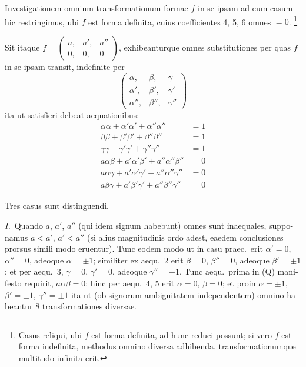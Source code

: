\documentclass[12pt,a4paper]{article}
\theoremstyle{plain}
\theoremstyle{definition}
\theoremstyle{remark}
\begin{document}
\begin{otherlanguage}{latin}
Investigationem omnium transformationum formae $f$ in se ipsam ad eum casum hic restringimus, ubi $f$ est forma definita, cuius coefficientes 4, 5, 6 omnes $= 0$.
\footnote{Casus reliqui, ubi $f$ est forma definita, ad hunc reduci possunt; si vero $f$ est forma indefinita, methodus omnino diversa adhibenda, transformationumque multitudo infinita erit.}

Sit itaque $f = \begin{pmatrix} a, & a', & a'' \\ 0, & 0, & 0 \end{pmatrix}$, exhibeanturque omnes substitutiones per quas $f$ in se ipsam transit, indefinite per
\[
\begin{pmatrix} \alpha, & \beta, & \gamma \\ \alpha', & \beta', & \gamma' \\ \alpha'', & \beta'', & \gamma'' \end{pmatrix}
\]
ita ut satisfieri debeat aequationibus:
\begin{align*}
\alpha\alpha + \alpha'\alpha' + \alpha''\alpha'' &= 1 \\
\beta\beta + \beta'\beta' + \beta''\beta'' &= 1 \\
\gamma\gamma + \gamma'\gamma' + \gamma''\gamma'' &= 1 \\
a\alpha\beta + a'\alpha'\beta' + a''\alpha''\beta'' &= 0 \\
a\alpha\gamma + a'\alpha'\gamma' + a''\alpha''\gamma'' &= 0 \\
a\beta\gamma + a'\beta'\gamma' + a''\beta''\gamma'' &= 0 \tag{Q}
\end{align*}

Tres casus sunt distinguendi.

\textit{I.}\ Quando $a$, $a'$, $a''$ (qui idem signum habebunt) omnes sunt inaequales, supponamus $a < a'$, $a' < a''$ (si alius magnitudinis ordo adest, eaedem conclusiones prorsus simili modo eruentur). Tunc eodem modo ut in casu praec.\ erit $\alpha' = 0$, $\alpha'' = 0$, adeoque $\alpha = \pm 1$; similiter ex aequ.\ 2 erit $\beta = 0$, $\beta'' = 0$, adeoque $\beta' = \pm 1$; et per aequ.\ 3, $\gamma = 0$, $\gamma' = 0$, adeoque $\gamma'' = \pm 1$. Tunc aequ.\ prima in (Q) manifesto requirit, $a\alpha\beta = 0$; hinc per aequ.\ 4, 5 erit $\alpha = 0$, $\beta = 0$; et proin $\alpha = \pm 1$, $\beta' = \pm 1$, $\gamma'' = \pm 1$ ita ut (ob signorum ambiguitatem independentem) omnino habeantur 8 transformationes diversae.


\end{otherlanguage}
\end{document}
